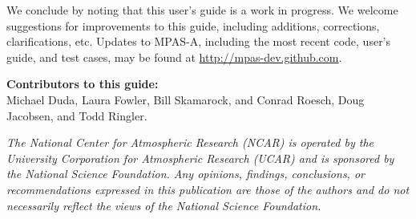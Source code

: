 We conclude by noting that this user's guide is a work in progress.  We welcome suggestions for improvements to this guide, including additions, corrections, clarifications, etc.  Updates to MPAS-A, including the most recent code,
user's guide, and test cases, may be found at \hfil\break \url{http://mpas-dev.github.com}.

\vspace{8pt}
\noindent
{\bf Contributors to this guide:}\\
Michael Duda, Laura Fowler, Bill Skamarock, and Conrad Roesch, 
Doug Jacobsen, and Todd Ringler.


\vfil
\noindent
{\it The National Center for Atmospheric Research (NCAR) is operated by the
University Corporation for Atmospheric Research (UCAR) and is sponsored by the
National Science Foundation.  Any opinions, findings, conclusions, or
recommendations expressed in this publication are those of the authors and do
not necessarily reflect the views of the National Science Foundation.}
